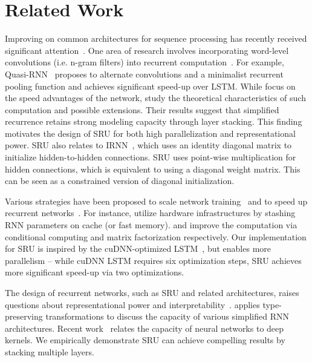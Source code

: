 \documentclass[11pt,a4paper]{article}
\newcommand{\yae}[2]{{#1}{#2}}
\begin{document}
 
\section{Related Work}
\label{sec:related}

Improving on common architectures for sequence processing has recently received significant attention~\citep{greff2015lstm,BalduzziG16,miao2016simplifying,zoph2016neural,lee2017recurrent}. 
One area of research involves incorporating word-level convolutions (i.e. n-gram filters) into recurrent computation~\citep{lei:2015:EMNLP,bradbury2016quasi,lei2017deriving}.
For example, Quasi-RNN~\citep{bradbury2016quasi} proposes to alternate convolutions and a minimalist recurrent pooling function and achieves significant speed-up over LSTM.
\yae{While \citet{bradbury2016quasi} focus on the speed advantages of the network, \citet{lei2017deriving} study the theoretical characteristics of such computation and possible extensions.}{}
\yae{Their results suggest that simplified recurrence retains strong modeling capacity through layer stacking.}{}
\yae{This finding motivates the design of SRU for both high parallelization and representational power.}{}
SRU also relates to IRNN~\citep{le2015simple}, which uses an identity diagonal matrix to initialize hidden-to-hidden connections.
SRU uses point-wise multiplication for hidden connections, which is equivalent to using a diagonal weight matrix.
This can be seen as a constrained version of diagonal initialization.

Various strategies have been proposed to scale network training~\citep{goyal2017accurate} and to speed up recurrent networks~\citep{diamos2016persistent,shazeer2017outrageously,kuchaiev2017factorization}.
For instance, \citet{diamos2016persistent} utilize hardware infrastructures by stashing RNN parameters on cache (or fast memory).
\citet{shazeer2017outrageously} and \citet{kuchaiev2017factorization} improve the computation via conditional computing and matrix factorization respectively.
Our implementation for SRU is inspired by the cuDNN-optimized LSTM~\citep{cudnnlstm}, but enables more parallelism -- while cuDNN LSTM requires six optimization steps, SRU achieves more significant speed-up via two optimizations.


The design of recurrent networks, such as SRU and related architectures, raises questions about representational power and interpretability~\citep{chen2017recurrent,peng2018emnlp}.
\citet{BalduzziG16} applies type-preserving transformations to discuss the capacity of various simplified RNN architectures. 
Recent work~\citep{anselmi2015deep,DanielyFS16,zhang16l1,lei2017deriving} relates the capacity of neural networks to deep kernels.
We empirically demonstrate SRU can achieve compelling results by stacking multiple layers.
 
\end{document}
